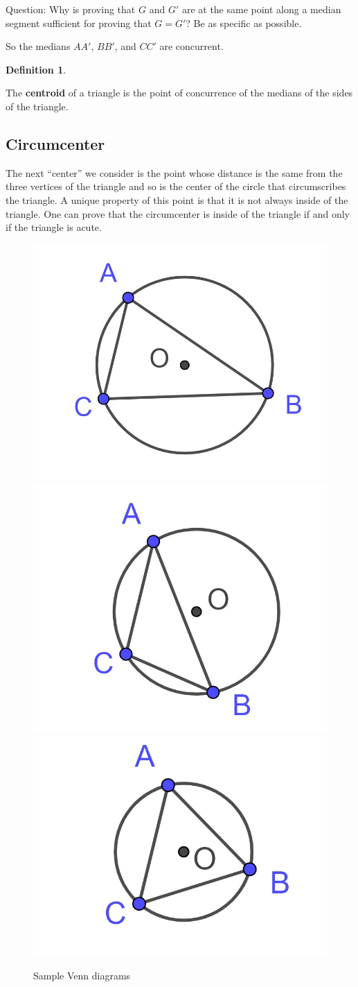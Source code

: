 \documentclass[
]{book}
\theoremstyle{definition}
\newtheorem{definition}{Definition}[chapter]
\theoremstyle{definition}
\theoremstyle{definition}
\theoremstyle{definition}
\theoremstyle{remark}
\begin{document}
Question: Why is proving that \(G\) and \(G'\) are at the same point along a median segment sufficient for proving that \(G=G'\)? Be as specific as possible.

So the medians \(AA'\), \(BB'\), and \(CC'\) are concurrent.

\begin{definition}
\protect\hypertarget{def:unlabeled-div-188}{}\label{def:unlabeled-div-188}

The \textbf{centroid} of a triangle is the point of concurrence of the medians of the sides of the triangle.

\end{definition}

\hypertarget{circumcenter}{%
\subsection{Circumcenter}\label{circumcenter}}

The next ``center'' we consider is the point whose distance is the same from the three vertices of the triangle and so is the center of the circle that circumscribes the triangle. A unique property of this point is that it is not always inside of the triangle. One can prove that the circumcenter is inside of the triangle if and only if the triangle is acute.

\begin{figure}

{\centering \includegraphics[width=0.3\linewidth]{images/circumcenter2} \includegraphics[width=0.3\linewidth]{images/circumcenter3} \includegraphics[width=0.3\linewidth]{images/circumcenter4} 

}

\caption{Sample Venn diagrams}\label{fig:unnamed-chunk-134}
\end{figure}
\end{document}

